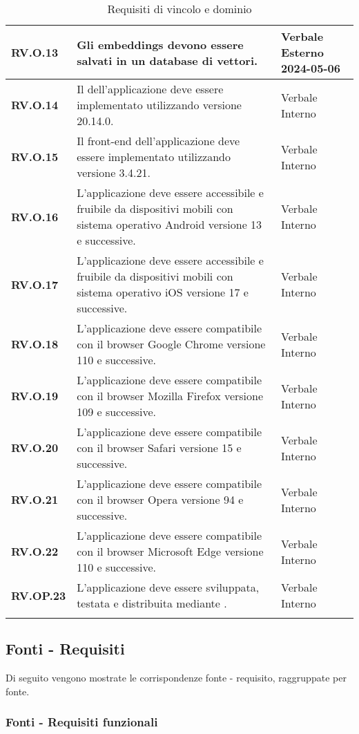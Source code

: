 \begin{longtable}{|P{3cm}|P{6,5cm}|>{\arraybackslash}P{4cm}|}
  \hline
  \textbf{RV.O.13} & Gli embeddings devono essere salvati in un database di vettori. & Verbale Esterno 2024-05-06 \\
  \hline
  \textbf{RV.O.14} & Il  dell'applicazione deve essere implementato utilizzando  versione 20.14.0. & Verbale Interno \\
  \hline
  \textbf{RV.O.15} & Il front-end dell'applicazione deve essere implementato utilizzando  versione 3.4.21. & Verbale Interno \\
  \hline
  \textbf{RV.O.16} & L'applicazione deve essere accessibile e fruibile da dispositivi mobili con sistema operativo Android versione 13 e successive. & Verbale Interno \\
  \hline
  \textbf{RV.O.17} & L'applicazione deve essere accessibile e fruibile da dispositivi mobili con sistema operativo iOS versione 17 e successive. & Verbale Interno \\
  \hline
  \textbf{RV.O.18} & L'applicazione deve essere compatibile con il browser Google Chrome versione 110 e successive. & Verbale Interno \\
  \hline
  \textbf{RV.O.19} & L'applicazione deve essere compatibile con il browser Mozilla Firefox versione 109 e successive. & Verbale Interno \\
  \hline
  \textbf{RV.O.20} & L'applicazione deve essere compatibile con il browser Safari versione 15 e successive. & Verbale Interno \\
  \hline
  \textbf{RV.O.21} & L'applicazione deve essere compatibile con il browser Opera versione 94 e successive. & Verbale Interno \\
  \hline
  \textbf{RV.O.22} & L'applicazione deve essere compatibile con il browser Microsoft Edge versione 110 e successive. & Verbale Interno \\
  \hline
  \textbf{RV.OP.23} & L'applicazione deve essere sviluppata, testata e distribuita mediante . & Verbale Interno \\
  \hline
\caption{Requisiti di vincolo e dominio}
\label{requisitivincolo}
\end{longtable}

\subsection{Fonti - Requisiti}
Di seguito vengono mostrate le corrispondenze fonte - requisito, raggruppate per fonte.

\subsubsection{Fonti - Requisiti funzionali}

